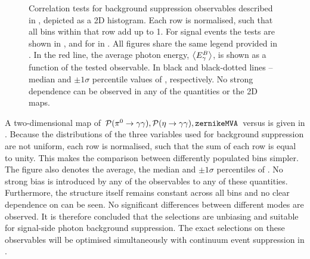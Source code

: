 \begin{figure}[htbp!]
{        }
    \caption{\label{fig:selection_correlations} Correlation tests for background suppression observables described in , depicted as a 2D histogram.
    Each row is normalised, such that all bins within that row add up to 1.
    For signal \MC \BptoXsgamma events the tests are shown
    in ,
    and for \BztoXsgamma in .
    All figures share the same legend provided in .
    In the red line, the average photon energy, $\expval{{\ensuremath{E^B_{\gamma}}}}$, is shown as a function of the tested observable.
    In black and black-dotted lines -- median and $\pm 1 \sigma$ percentile values of \EB, respectively.
    No strong dependence can be observed in any of the quantities or the 2D maps.
    }
\end{figure}

A two-dimensional map of ${{\mathcal{P}(\pi^0\rightarrow\gamma\gamma)},{\mathcal{P}(\eta\rightarrow\gamma\gamma)},{\texttt{zernikeMVA}}}$ versus \EB is given in .
Because the distributions of the three variables used for background suppression are not uniform, each row is normalised, such that the sum of each row is equal to unity.
This makes the comparison between differently populated bins simpler.
The figure also denotes the average, the median and $\pm 1\sigma$ percentiles of \EB.
No strong bias is introduced by any of the observables to any of these quantities.
Furthermore, the structure itself remains constant across all bins and no clear dependence on \EB can be seen.
No significant differences between different \FEI modes are observed.
It is therefore concluded that the selections are unbiasing and suitable for signal-side photon background suppression.
The exact selections on these observables will be optimised simultaneously with continuum event suppression in .